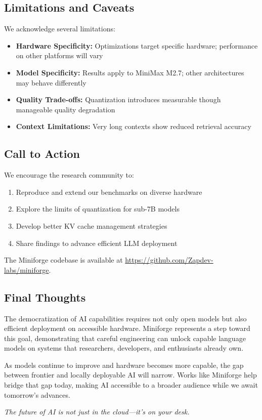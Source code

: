 \subsection{Limitations and Caveats}

We acknowledge several limitations:

\begin{itemize}
    \item \textbf{Hardware Specificity:} Optimizations target specific hardware; performance on other platforms will vary
    \item \textbf{Model Specificity:} Results apply to MiniMax M2.7; other architectures may behave differently
    \item \textbf{Quality Trade-offs:} Quantization introduces measurable though manageable quality degradation
    \item \textbf{Context Limitations:} Very long contexts show reduced retrieval accuracy
\end{itemize}

\subsection{Call to Action}

We encourage the research community to:

\begin{enumerate}
    \item Reproduce and extend our benchmarks on diverse hardware
    \item Explore the limits of quantization for sub-7B models
    \item Develop better KV cache management strategies
    \item Share findings to advance efficient LLM deployment
\end{enumerate}

The Miniforge codebase is available at \url{https://github.com/Zapdev-labs/miniforge}.

\subsection{Final Thoughts}

The democratization of AI capabilities requires not only open models but also efficient deployment on accessible hardware. Miniforge represents a step toward this goal, demonstrating that careful engineering can unlock capable language models on systems that researchers, developers, and enthusiasts already own.

As models continue to improve and hardware becomes more capable, the gap between frontier and locally deployable AI will narrow. Works like Miniforge help bridge that gap today, making AI accessible to a broader audience while we await tomorrow's advances.

\vspace{1em}
\begin{center}
\textit{The future of AI is not just in the cloud---it's on your desk.}
\end{center}
